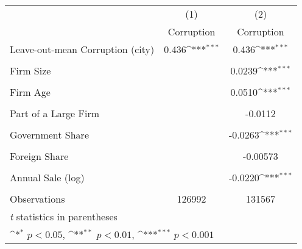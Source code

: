 {
\def\sym#1{\ifmmode^{#1}\else\(^{#1}\)\fi}
\begin{tabular}{l*{2}{c}}
\hline\hline
                    &\multicolumn{1}{c}{(1)}&\multicolumn{1}{c}{(2)}\\
                    &\multicolumn{1}{c}{Corruption}&\multicolumn{1}{c}{Corruption}\\
\hline
Leave-out-mean Corruption (city)&       0.436\sym{***}&       0.436\sym{***}\\
                    &                     &                     \\
[1em]
Firm Size           &                     &      0.0239\sym{***}\\
                    &                     &                     \\
[1em]
Firm Age            &                     &      0.0510\sym{***}\\
                    &                     &                     \\
[1em]
Part of a Large Firm&                     &     -0.0112         \\
                    &                     &                     \\
[1em]
Government Share    &                     &     -0.0263\sym{***}\\
                    &                     &                     \\
[1em]
Foreign Share       &                     &    -0.00573         \\
                    &                     &                     \\
[1em]
Annual Sale (log)   &                     &     -0.0220\sym{***}\\
                    &                     &                     \\
\hline
Observations        &      126992         &      131567         \\
\hline\hline
\multicolumn{3}{l}{\footnotesize \textit{t} statistics in parentheses}\\
\multicolumn{3}{l}{\footnotesize \sym{*} \(p<0.05\), \sym{**} \(p<0.01\), \sym{***} \(p<0.001\)}\\
\end{tabular}
}

